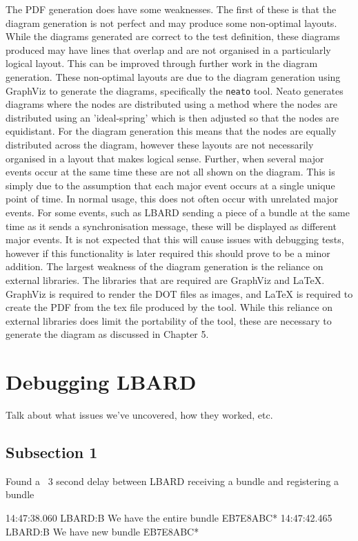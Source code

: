 The PDF generation does have some weaknesses.
The first of these is that the diagram generation is not perfect and may produce some non-optimal layouts.
While the diagrams generated are correct to the test definition, these diagrams produced may have lines that overlap and are not organised in a particularly logical layout.
This can be improved through further work in the diagram generation. 
These non-optimal layouts are due to the diagram generation using GraphViz to generate the diagrams, specifically the \texttt{neato} tool.
Neato generates diagrams where the nodes are distributed using a method where the nodes are distributed using an 'ideal-spring' which is then adjusted so that the nodes are equidistant. 
For the diagram generation this means that the nodes are equally distributed across the diagram, however these layouts are not necessarily organised in a layout that makes logical sense.
Further, when several major events occur at the same time these are not all shown on the diagram.
This is simply due to the assumption that each major event occurs at a single unique point of time.
In normal usage, this does not often occur with unrelated major events.
For some events, such as LBARD sending a piece of a bundle at the same time as it sends a synchronisation message, these will be displayed as different major events.
It is not expected that this will cause issues with debugging tests, however if this functionality is later required this should prove to be a minor addition.
The largest weakness of the diagram generation is the reliance on external libraries.
The libraries that are required are GraphViz and LaTeX.
GraphViz is required to render the DOT files as images, and LaTeX is required to create the PDF from the \.tex file produced by the tool.
While this reliance on external libraries does limit the portability of the tool, these are necessary to generate the diagram as discussed in Chapter 5.


\section{Debugging LBARD}
Talk about what issues we've uncovered, how they worked, etc.

\subsection{Subsection 1}
Found a ~3 second delay between LBARD receiving a bundle and registering a bundle

14:47:38.060 LBARD:B We have the entire bundle EB7E8ABC*
14:47:42.465 LBARD:B We have new bundle EB7E8ABC*

